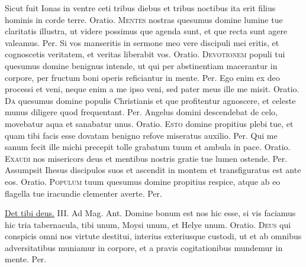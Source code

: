 \begin{multicols*}{2}
 Sicut fuit Ionas in ventre ceti tribus diebus et tribus noctibus ita erit filius hominis in corde terre. {\color{Red} Oratio.}
\lettrine[lines=2]{\zallmancaps \color{Red} M}{entes} nostras quesumus domine lumine tue claritatis illustra, ut videre possimus que agenda sunt, et que recta sunt agere valeamus. Per.
 Si vos manseritis in sermone meo vere discipuli mei eritis, et cognoscetis veritatem, et veritas liberabit vos. {\color{Red} Oratio.}
\lettrine[lines=2]{\zallmancaps \color{Blue} D}{evotionem} populi tui quesumus domine benignus intende, ut qui per abstinentiam macerantur in corpore, per fructum boni operis reficiantur in mente. Per.
 Ego enim ex deo processi et veni, neque enim a me ipso veni, sed pater meus ille me misit. {\color{Red} Oratio.}
\lettrine[lines=2]{\zallmancaps \color{Red} D}{a} quesumus domine populis Christianis et que profitentur agnoscere, et celeste munus diligere quod frequentant. Per.
 Angelus domini descendebat de celo, movebatur aqua et sanabatur unus. {\color{Red} Oratio.}
\lettrine[lines=2]{\zallmancaps \color{Blue} E}{sto} domine propitius plebi tue, et quam tibi facis esse dovatam benigno refove miseratus auxilio. Per.
 Qui me sanum fecit ille michi precepit tolle grabatum tuum et ambula in pace. {\color{Red} Oratio.}
\lettrine[lines=2]{\zallmancaps \color{Red} E}{xaudi} nos misericors deus et mentibus nostris gratie tue lumen ostende. Per.
 Assumpsit Ihesus discipulos suos et ascendit in montem et transfiguratus est ante eos. {\color{Red} Oratio.}
\lettrine[lines=2]{\zallmancaps \color{Blue} P}{opulum} tuum quesumus domine propitius respice, atque ab eo flagella tue iracundie clementer averte. Per.
{\color{Red} }
\par {} \R \hyperlink{det-tibi-deus}{Det tibi deus.} {\color{Red} III. Ad Mag. Ant.} Domine bonum est nos hic esse, si vis faciamus hic tria tabernacula, tibi unum, Moysi unum, et Helye unum. {\color{Red} Oratio.}
\lettrine[lines=2]{\zallmancaps \color{Red} D}{eus} qui conspicis omni nos virtute destitui, interius exteriusque custodi, ut et ab omnibus adversitatibus muniamur in corpore, et a pravis cogitationibus mundemur in mente. Per.

\end{multicols*}
